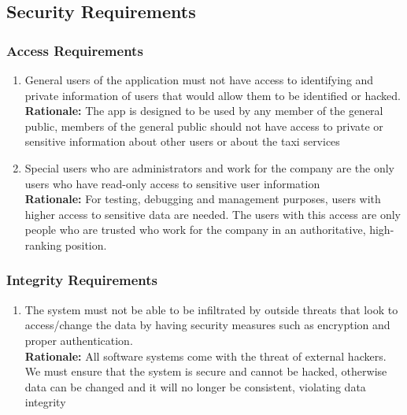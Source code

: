 \documentclass[]{article}
\begin{document}

\subsection{Security Requirements}
\label{sub:security_requirements}

\subsubsection{Access Requirements}
\label{ssub:access_requirements}
\begin{enumerate}[{SR-AC}1. ]
	\item General users of the application must not have access to identifying and private information of users that would allow them to be identified or hacked. \\
	{\bf Rationale:} The app is designed to be used by any member of the general public, members of the general public should not have access to private or sensitive information about other users or about the taxi services 
	\item Special users who are administrators and work for the company are the only users who have read-only access to sensitive user information \\
	{\bf Rationale:} For testing, debugging and management purposes, users with higher access to sensitive data are needed. The users with this access are only people who are trusted who work for the company in an authoritative, high-ranking position.
\end{enumerate}

\subsubsection{Integrity Requirements}
\label{ssub:integrity_requirements}
\begin{enumerate}[{SR-INT}1. ]
	\item The system must not be able to be infiltrated by outside threats that look to access/change the data by having security measures such as encryption and proper authentication. \\
	{\bf Rationale:} All software systems come with the threat of external hackers. We must ensure that the system is secure and cannot be hacked, otherwise data can be changed and it will no longer be consistent, violating data integrity 
\end{enumerate}
\end{document}
